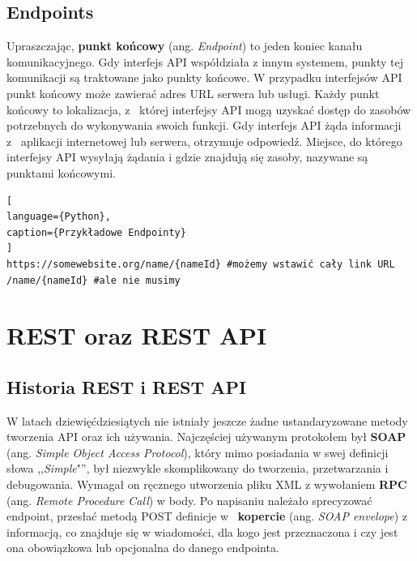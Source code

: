 \documentclass[oneside,polski,logo,indent]{amuthesis}
\begin{document}

\begin{center}
\subsection{Endpoints}
\end{center}
Upraszczając, \textbf{punkt końcowy} (ang. \emph{Endpoint}) to jeden koniec kanału komunikacyjnego. Gdy interfejs API współdziała z innym systemem, punkty tej komunikacji są traktowane jako punkty końcowe. W przypadku interfejsów API punkt końcowy może zawierać adres URL serwera lub usługi. Każdy punkt końcowy to lokalizacja, z~ której interfejsy API mogą uzyskać dostęp do zasobów potrzebnych do wykonywania swoich funkcji. Gdy interfejs API żąda informacji z~ aplikacji internetowej lub serwera, otrzymuje odpowiedź. Miejsce, do którego interfejsy API wysyłają żądania i gdzie znajdują się zasoby, nazywane są punktami końcowymi.

\begin{lstlisting}[
language={Python},
caption={Przykładowe Endpointy}
]
https://somewebsite.org/name/{nameId} #możemy wstawić cały link URL
/name/{nameId} #ale nie musimy
\end{lstlisting}

\newpage 
\section{REST oraz REST API}

\begin{center}
\subsection{Historia REST i REST API}
\end{center}

W latach dziewięćdziesiątych nie istniały jeszcze żadne ustandaryzowane metody tworzenia API oraz ich używania. Najczęściej używanym protokołem był \textbf{SOAP} (ang. \emph{Simple Object Access Protocol}), który mimo posiadania w swej definicji słowa ,,\emph{Simple}"'', był niezwykle skomplikowany do tworzenia, przetwarzania i debugowania. Wymagał on ręcznego utworzenia pliku XML z wywołaniem \textbf{RPC} (ang. \emph{Remote Procedure Call}) w body. Po napisaniu należało sprecyzować endpoint, przesłać metodą POST definicje w~ \textbf{kopercie} (ang. \emph{SOAP envelope}) z informacją, co znajduje się w wiadomości, dla kogo jest przeznaczona i czy jest ona obowiązkowa lub opcjonalna do danego endpointa.
\end{document}
